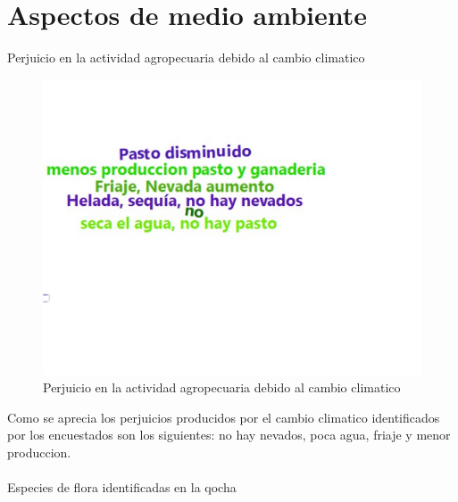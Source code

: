 \documentclass[12pt]{article}\usepackage[]{graphicx}\usepackage[]{xcolor}
\makeatletter
\def\maxwidth{ %
  \ifdim\Gin@nat@width>\linewidth
    \linewidth
  \else
    \Gin@nat@width
  \fi
}
\newenvironment{knitrout}{}{} %
\makeatother
\begin{document}
	\section{Aspectos de medio ambiente}
	Perjuicio en la actividad agropecuaria debido al cambio climatico
	\begin{figure}[H]
	\centering
\begin{knitrout}
\color{fgcolor}
\includegraphics[width=\maxwidth]{figure/treinta-1} 
\end{knitrout}
	\caption{Perjuicio en la actividad agropecuaria debido al cambio climatico}
	\end{figure}
	Como se aprecia los perjuicios producidos por el cambio climatico identificados por los encuestados son los siguientes: no hay nevados, poca agua, friaje y menor produccion.\\
	\\
	Especies de flora identificadas en la qocha
	
\end{document}
